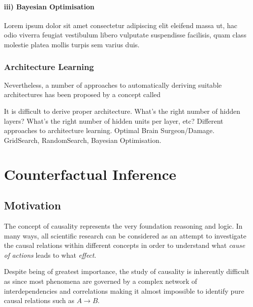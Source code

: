 \paragraph{iii) Bayesian Optimisation} Lorem ipsum dolor sit amet consectetur adipiscing elit eleifend massa ut, hac odio viverra feugiat vestibulum libero vulputate suspendisse facilisis, quam class molestie platea mollis turpis sem varius duis.


\subsubsection{Architecture Learning}
Nevertheless, a number of approaches to automatically deriving suitable architectures has been proposed by a concept called 

It is difficult to derive proper architecture. 
What's the right number of hidden layers? What's the right number of hidden units per layer, etc? 
Different approaches to architecture learning. Optimal Brain Surgeon/Damage. GridSearch, RandomSearch, Bayesian Optimisation.

%

\section{Counterfactual Inference} \label{sec:counterfactual-inference}

\subsection{Motivation}
The concept of causality represents the very foundation reasoning and logic. In many ways, all scientific research can be considered as an attempt to investigate the causal relations within different concepts in order to understand what \emph{cause of actions} leads to what \emph{effect}.

Despite being of greatest importance, the study of causality is inherently difficult as since most phenomena are governed by a complex network of interdependencies and correlations making it almost impossible to identify pure causal relations such as $A \rightarrow B$.  

